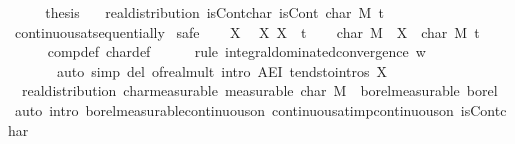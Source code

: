 \documentclass{article}
\theoremstyle{definition}
\begin{document}
\begin{isabellebody}
\ \ \isamarkupfalse%
\ \isamarkupfalse%
\ {\isacharquery}thesis\ \isacommand{{\isachardot}}\isamarkupfalse%
\isanewline
{}
\isamarkupfalse%
\ {\isacharparenleft}\ real{\isacharunderscore}distribution{\isacharparenright}\ isCont{\isacharunderscore}char{\isacharcolon}\ {\isachardoublequoteopen}isCont\ {\isacharparenleft}char\ M{\isacharparenright}\ t{\isachardoublequoteclose}\isanewline
{}\isamarkupfalse%
\ continuous{\isacharunderscore}at{\isacharunderscore}sequentially\isanewline
{}\isamarkupfalse%
\ safe\isanewline
\ \ \isamarkupfalse%
\ X\ \isamarkupfalse%
\ X{\isacharcolon}\ {\isachardoublequoteopen}X\ {\isacharminus}{\isacharminus}{\isacharminus}{\isacharminus}{\isachargreater}\ t{\isachardoublequoteclose}\isanewline
\ \ \isamarkupfalse%
\ {\isachardoublequoteopen}{\isacharparenleft}char\ M\ {\isasymcirc}\ X{\isacharparenright}\ {\isacharminus}{\isacharminus}{\isacharminus}{\isacharminus}{\isachargreater}\ char\ M\ t{\isachardoublequoteclose}\isanewline
\ \ \ \ \isamarkupfalse%
\ comp{\isacharunderscore}def\ char{\isacharunderscore}def\isanewline
\ \ \ \ \isamarkupfalse%
\ {\isacharparenleft}rule\ integral{\isacharunderscore}dominated{\isacharunderscore}convergence{\isacharbrackleft}\ w{\isacharequal}{\isachardoublequoteopen}{\isasymlambda}{\isacharunderscore}{\isachardot}\ {}{\isachardoublequoteclose}{\isacharbrackright}{\isacharparenright}\isanewline
\ \ \ \ \ \ \ {\isacharparenleft}auto\ simp\ del{\isacharcolon}\ of{\isacharunderscore}real{\isacharunderscore}mult\ intro{\isacharbang}{\isacharcolon}\ AE{\isacharunderscore}I{}\ tendsto{\isacharunderscore}intros\ X{\isacharparenright}\isanewline
{}
\isamarkupfalse%
\ {\isacharparenleft}\ real{\isacharunderscore}distribution{\isacharparenright}\ char{\isacharunderscore}measurable\ {\isacharbrackleft}measurable{\isacharbrackright}{\isacharcolon}\ {\isachardoublequoteopen}char\ M\ {\isasymin}\ borel{\isacharunderscore}measurable\ borel{\isachardoublequoteclose}\isanewline
{}\isamarkupfalse%
\ {\isacharparenleft}auto\ intro{\isacharbang}{\isacharcolon}\ borel{\isacharunderscore}measurable{\isacharunderscore}continuous{\isacharunderscore}on{}\ continuous{\isacharunderscore}at{\isacharunderscore}imp{\isacharunderscore}continuous{\isacharunderscore}on\ isCont{\isacharunderscore}char{\isacharparenright}%
\end{isabellebody}
\end{document}
